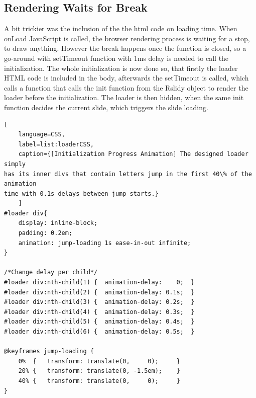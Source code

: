 \subsection{Rendering Waits for Break} %
\label{sub:rendering_waits_for_break}

A bit trickier was the inclusion of the the html code on loading time. When 
onLoad JavaScript is called, the browser rendering process is waiting for a 
stop, to draw anything. However the break happens once the function is closed, 
so a go-around with setTimeout function with 1ms delay is needed to call the 
initialization. The whole initialization is now done so, that firstly the 
loader HTML code is included in the body, afterwards the setTimeout is called, 
which calls a function that calls the init function from the Rslidy object to 
render the loader before the initialization. The loader is then hidden, when 
the same init function decides the current slide, which triggers the slide 
loading.



\begin{minipage}{\linewidth}
	\begin{lstlisting}[
	language=CSS,
	label=list:loaderCSS,
	caption={[Initialization Progress Animation] The designed loader simply 
has its inner divs that contain letters jump in the first 40\% of the animation 
time with 0.1s delays between jump starts.}
	]
#loader div{
	display: inline-block;
	padding: 0.2em;
	animation: jump-loading 1s ease-in-out infinite;
}

/*Change delay per child*/
#loader div:nth-child(1) {  animation-delay: 	0;	}
#loader div:nth-child(2) {  animation-delay: 0.1s;	}
#loader div:nth-child(3) {  animation-delay: 0.2s;	}
#loader div:nth-child(4) {  animation-delay: 0.3s;	}
#loader div:nth-child(5) {  animation-delay: 0.4s;	}
#loader div:nth-child(6) {  animation-delay: 0.5s;	}

@keyframes jump-loading {
	0%	{	transform: translate(0,		0);		}
	20% {	transform: translate(0, -1.5em);	}
	40% {	transform: translate(0,		0);		}
}
	\end{lstlisting}
\end{minipage}

